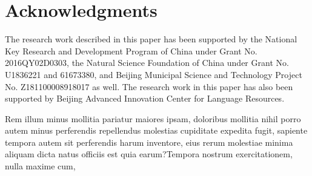 \documentclass[letterpaper]{article} %
\begin{document}
\section{ Acknowledgments}
The research work described in this paper has been supported by the National Key Research and Development Program of China under Grant No. 2016QY02D0303, the Natural Science Foundation of China under Grant No. U1836221 and 61673380, and Beijing Municipal Science and Technology Project No. Z181100008918017 as well. The research work in this paper has also been supported by Beijing Advanced Innovation Center for Language Resources.


Rem illum minus mollitia pariatur maiores ipsam, doloribus mollitia nihil porro autem minus perferendis repellendus molestias cupiditate expedita fugit, sapiente tempora autem sit perferendis harum inventore, eius rerum molestiae minima aliquam dicta natus officiis est quia earum?Tempora nostrum exercitationem, nulla maxime cum,

\end{document}
